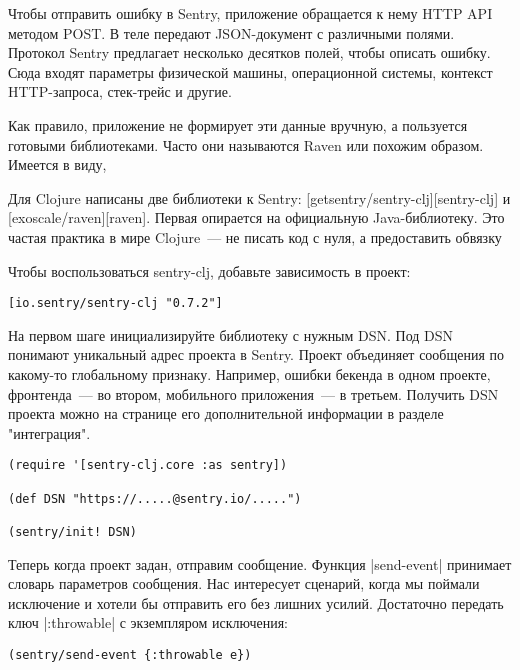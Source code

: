 Чтобы отправить ошибку в Sentry, приложение обращается к нему HTTP API методом
POST. В теле передают JSON-документ с различными полями. Протокол Sentry
предлагает несколько десятков полей, чтобы описать ошибку. Сюда входят параметры
физической машины, операционной системы, контекст HTTP-запроса, стек-трейс и
другие.

Как правило, приложение не формирует эти данные вручную, а пользуется готовыми
библиотеками. Часто они называются Raven или похожим образом. Имеется в виду,


Для Clojure написаны две библиотеки к Sentry: [getsentry/sentry-clj][sentry-clj]
и [exoscale/raven][raven]. Первая опирается на официальную Java-библиотеку. Это
частая практика в мире Clojure~--- не писать код с нуля, а предоставить обвязку

Чтобы воспользоваться sentry-clj, добавьте зависимость в проект:

\begin{verbatim}
[io.sentry/sentry-clj "0.7.2"]
\end{verbatim}

На первом шаге инициализируйте библиотеку с нужным DSN. Под DSN понимают
уникальный адрес проекта в Sentry. Проект объединяет сообщения по какому-то
глобальному признаку. Например, ошибки бекенда в одном проекте, фронтенда~--- во
втором, мобильного приложения~--- в третьем. Получить DSN проекта можно на
странице его дополнительной информации в разделе "интеграция".

\begin{verbatim}
(require '[sentry-clj.core :as sentry])

(def DSN "https://.....@sentry.io/.....")

(sentry/init! DSN)
\end{verbatim}

Теперь когда проект задан, отправим сообщение. Функция \spverb|send-event| принимает
словарь параметров сообщения. Нас интересует сценарий, когда мы поймали
исключение и хотели бы отправить его без лишних усилий. Достаточно передать ключ
\spverb|:throwable| с экземпляром исключения:

\begin{verbatim}
(sentry/send-event {:throwable e})
\end{verbatim}

